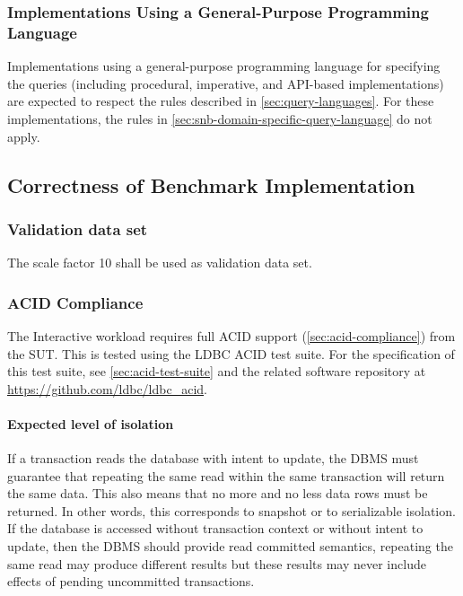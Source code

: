 \subsubsection{Implementations Using a General-Purpose Programming Language}
\label{sec:snb-general-purpose-programming-language}

Implementations using a general-purpose programming language for specifying the queries (including procedural, imperative, and API-based implementations) are expected to respect the rules described in \autoref{sec:query-languages}.
For these implementations, the rules in \autoref{sec:snb-domain-specific-query-language} do not apply.

\subsection{Correctness of Benchmark Implementation}

\subsubsection{Validation data set}
\label{sec:int-validation-data-set}
The scale factor 10 shall be used as validation data set.

\subsubsection{ACID Compliance}
\label{sec:int-acid-compliance}

The Interactive workload requires full ACID support (\autoref{sec:acid-compliance}) from the SUT.
This is tested using the LDBC ACID test suite.
For the specification of this test suite, see \autoref{sec:acid-test-suite} and the related software repository at \url{https://github.com/ldbc/ldbc_acid}.

\paragraph{Expected level of isolation}
If a transaction reads the database with intent to update, the DBMS must guarantee that repeating the same read within the same transaction will return the same data. This also means that no more and no less data rows must be returned. In other words, this corresponds to snapshot or to serializable isolation. If the database is accessed without transaction context or without intent to update, then the DBMS should provide read committed semantics, \eg repeating the same read may produce different results but these results may never include effects of pending uncommitted transactions.

